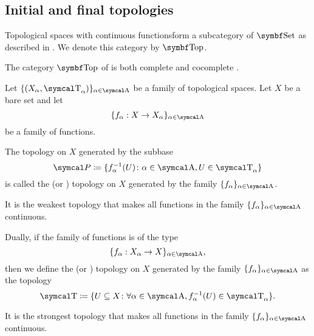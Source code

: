 \subsection{Initial and final topologies}\label{subsec:initial_final_topologies}

\begin{definition}\label{def:category_of_topological_spaces}
  Topological spaces with continuous functionsform a subcategory of \( \Cat{Set} \) as described in . We denote this category by \( \Cat{Top} \).
\end{definition}

\begin{theorem}\label{thm:top_complete_cocomplete}
  The category \( \Cat{Top} \) of is both complete  and cocomplete .
\end{theorem}

\begin{definition}\label{def:initial_topology}\cite{nLab:top}
  Let \( \{ (X_\al, \CT_\al) \}_{\al \in \CA} \) be a family of topological spaces. Let \( X \) be a bare set and let
  \begin{equation*}
    \{ f_\al: X \to X_\al \}_{\al \in \CA}
  \end{equation*}
  be a family of functions.

  The topology on \( X \) generated by the subbase
  \begin{equation*}
    \Cal{P} \coloneqq \{ f_\al^{-1}(U) \colon \al \in \CA, U \in \CT_\al \}
  \end{equation*}
  is called the  (or ) topology on \( X \) generated by the family \( \{ f_\al \}_{\al \in \CA} \).

  It is the weakest topology that makes all functions in the family \( \{ f_\al \}_{\al \in \CA} \) continuous.
\end{definition}

\begin{definition}\label{def:final_topology}\cite{nLab:top}
  Dually, if the family of functions is of the type
  \begin{equation*}
    \{ f_\al: X_\al \to X \}_{\al \in \CA},
  \end{equation*}
  then we define the  (or ) topology on \( X \) generated by the family \( \{ f_\al \}_{\al \in \CA} \) as the topology
  \begin{equation*}
    \CT \coloneqq \{ U \subseteq X \colon \forall \al \in \CA, f_\al^{-1}(U) \in \CT_\al \}.
  \end{equation*}

  It is the strongest topology that makes all functions in the family \( \{ f_\al \}_{\al \in \CA} \) continuous.
\end{definition}

